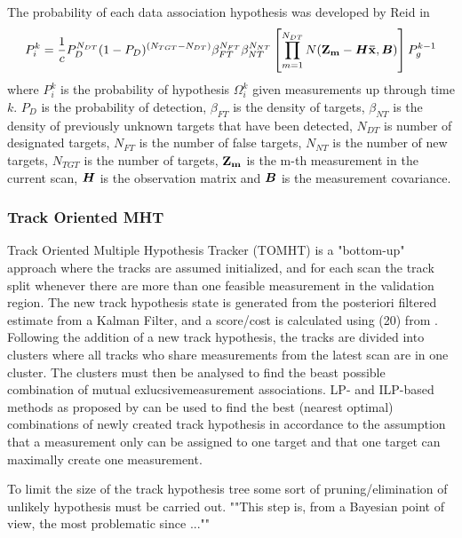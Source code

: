 The probability of each data association hypothesis was developed by Reid in \cite{Reid1978}
\begin{equation}
P_i^k = \frac{1}{c} P_D^{N_{DT}}(1-P_D)^{(N_{TGT}-N_{DT})} \beta_{FT}^{N_{FT}} \beta_{NT}^{N_{NT}} \left[ \prod_{m=1}^{N_{DT}} N(\boldsymbol{\mathbf{Z_m}}-\bm{H}\boldsymbol{\mathbf{\bar{x}}},\bm{B}) \right] P_g^{k-1}
\end{equation}
where $P_i^k$ is the probability of hypothesis $\Omega_i^k$ given measurements up through time $k$. $P_D$ is the probability of detection, $\beta_{FT}$ is the density of targets, $\beta_{NT}$ is the density of previously unknown targets that have been detected, $N_{DT}$ is number of designated targets, $N_{FT}$ is the number of false targets, $N_{NT}$ is the number of new targets, $N_{TGT}$ is the number of targets, $\boldsymbol{\mathbf{Z_m}}$ is the m-th measurement in the current scan, $\bm{H}$ is the observation matrix and $\bm{B}$ is the measurement covariance.

\subsubsection{Track Oriented MHT}
Track Oriented Multiple Hypothesis Tracker (TOMHT) is a "bottom-up" approach where the tracks are assumed initialized, and for each scan the track split whenever there are more than one feasible measurement in the validation region. The new track hypothesis state is generated from the posteriori filtered estimate from a Kalman Filter, and a score/cost is calculated using (20) from \cite{Bar-Shalom2007}. Following the addition of a new track hypothesis, the tracks are divided into clusters where all tracks who share measurements from the latest scan are in one cluster. The clusters must then be analysed to find the beast possible combination of mutual exlucsivemeasurement associations. LP- and ILP-based methods as proposed by \cite{Storms2003} can be used to find the best (nearest optimal) combinations of newly created track hypothesis in accordance to the assumption that a measurement only can be assigned to one target and that one target can maximally create one measurement.

To limit the size of the track hypothesis tree some sort of pruning/elimination of unlikely hypothesis must be carried out. ""This step is, from a Bayesian point of view, the most problematic since ...""




